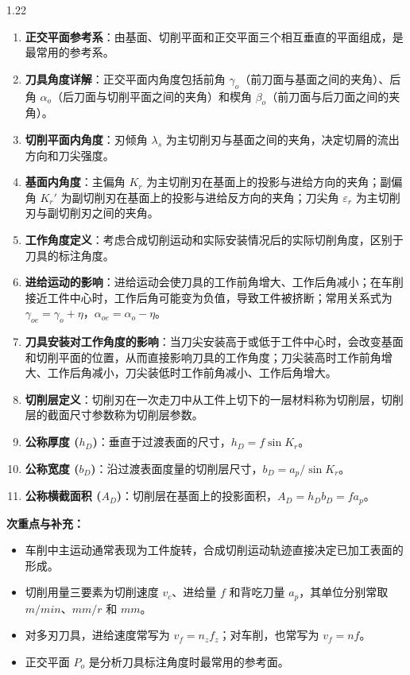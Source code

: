 \documentclass[12pt,a4paper]{article}
\begin{document}
\begin{spacing}{1.22}
\begin{tcolorbox}[colback=yellow!6,colframe=red!55!black,title=重点,left=1mm,right=1mm]
\begin{enumerate}[leftmargin=2.2em,label=\arabic*.]
  \item \textbf{正交平面参考系}：由基面、切削平面和正交平面三个相互垂直的平面组成，是最常用的参考系。
  \item \textbf{刀具角度详解}：正交平面内角度包括前角 $\gamma_o$（前刀面与基面之间的夹角）、后角 $\alpha_o$（后刀面与切削平面之间的夹角）和楔角 $\beta_o$（前刀面与后刀面之间的夹角）。
  \item \textbf{切削平面内角度}：刃倾角 $\lambda_s$ 为主切削刃与基面之间的夹角，决定切屑的流出方向和刀尖强度。
  \item \textbf{基面内角度}：主偏角 $K_r$ 为主切削刃在基面上的投影与进给方向的夹角；副偏角 $K_r'$ 为副切削刃在基面上的投影与进给反方向的夹角；刀尖角 $\varepsilon_r$ 为主切削刃与副切削刃之间的夹角。
  \item \textbf{工作角度定义}：考虑合成切削运动和实际安装情况后的实际切削角度，区别于刀具的标注角度。
  \item \textbf{进给运动的影响}：进给运动会使刀具的工作前角增大、工作后角减小；在车削接近工件中心时，工作后角可能变为负值，导致工件被挤断；常用关系式为 $\gamma_{oe}=\gamma_o+\eta$，$\alpha_{oe}=\alpha_o-\eta$。
  \item \textbf{刀具安装对工作角度的影响}：当刀尖安装高于或低于工件中心时，会改变基面和切削平面的位置，从而直接影响刀具的工作角度；刀尖装高时工作前角增大、工作后角减小，刀尖装低时工作前角减小、工作后角增大。
  \item \textbf{切削层定义}：切削刃在一次走刀中从工件上切下的一层材料称为切削层，切削层的截面尺寸参数称为切削层参数。
  \item \textbf{公称厚度 ($h_D$)}：垂直于过渡表面的尺寸，$h_D=f\sin K_r$。
  \item \textbf{公称宽度 ($b_D$)}：沿过渡表面度量的切削层尺寸，$b_D=a_p/\sin K_r$。
  \item \textbf{公称横截面积 ($A_D$)}：切削层在基面上的投影面积，$A_D=h_D b_D=f a_p$。
\end{enumerate}
\end{tcolorbox}
\noindent\textbf{次重点与补充：}
\begin{itemize}[leftmargin=2.2em,label=--]
  \item 车削中主运动通常表现为工件旋转，合成切削运动轨迹直接决定已加工表面的形成。
  \item 切削用量三要素为切削速度 $v_c$、进给量 $f$ 和背吃刀量 $a_p$，其单位分别常取 $m/min$、$mm/r$ 和 $mm$。
  \item 对多刃刀具，进给速度常写为 $v_f=n_zf_z$；对车削，也常写为 $v_f=nf$。
  \item 正交平面 $P_o$ 是分析刀具标注角度时最常用的参考面。

\end{itemize}
\end{spacing}
\end{document}
